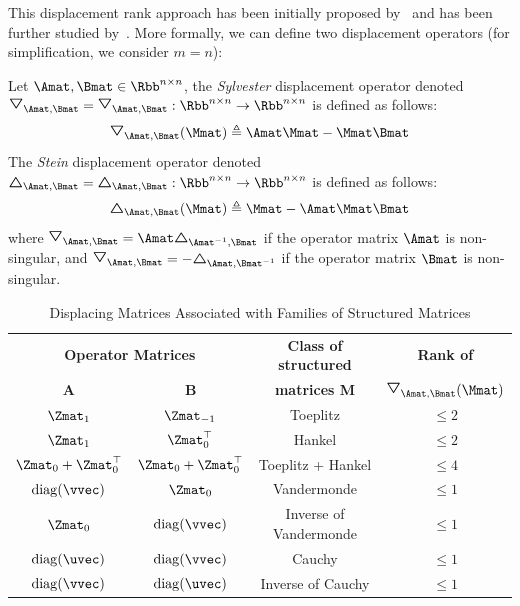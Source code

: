 This displacement rank approach has been initially proposed by~\citet{kailath1979displacement} and has been further studied by~\citet{kailath1995displacement,pan2001structured}.
More formally, we can define two displacement operators (for simplification, we consider $m = n$):
\begin{definition}
  Let $\Amat, \Bmat \in \Rbb^{n \times n}$, the \emph{Sylvester} displacement operator denoted $\triangleopdown_{\Amat, \Bmat} = \triangleopdown_{\Amat, \Bmat}: \Rbb^{n \times n} \rightarrow \Rbb^{n \times n}$ is defined as follows:
  \begin{equation}
    \triangleopdown_{\Amat, \Bmat} (\Mmat) \triangleq \Amat \Mmat - \Mmat \Bmat
  \end{equation}
  The \emph{Stein} displacement operator denoted $\triangleopup_{\Amat, \Bmat} = \triangleopup_{\Amat, \Bmat}: \Rbb^{n \times n} \rightarrow \Rbb^{n \times n}$ is defined as follows:
  \begin{equation}
    \triangleopup_{\Amat, \Bmat} (\Mmat) \triangleq \Mmat - \Amat \Mmat \Bmat
  \end{equation}
  where $\triangleopdown_{\Amat, \Bmat} = \Amat \triangleopup_{\Amat^{-1}, \Bmat}$ if the operator matrix $\Amat$ is non-singular, and $\triangleopdown_{\Amat, \Bmat} = -\triangleopup_{\Amat, \Bmat^{-1}}$ if the operator matrix $\Bmat$ is non-singular.
\end{definition}



\begin{table}[t]
  \centering
  \begin{tabular}{c|c|c|c}
    \toprule
    \multicolumn{2}{c|}{\textbf{Operator Matrices}} & \textbf{Class of structured} & \textbf{Rank of } \\
    \textbf{A} & \textbf{B} & \textbf{matrices M} & $\triangleopdown_{\Amat, \Bmat}(\Mmat)$ \\
    \midrule
    $\Zmat_1$                & $\Zmat_{-1}$             & Toeplitz               & $\leq 2$ \\
    $\Zmat_1$                & $\Zmat_0^\top$           & Hankel                 & $\leq 2$ \\
    $\Zmat_0 + \Zmat_0^\top$ & $\Zmat_0 + \Zmat_0^\top$ & Toeplitz + Hankel      & $\leq 4$ \\
    $\diag(\vvec)$           & $\Zmat_0$                & Vandermonde            & $\leq 1$ \\
    $\Zmat_0$                & $\diag(\vvec)$           & Inverse of Vandermonde & $\leq 1$ \\
    $\diag(\uvec)$           & $\diag(\vvec)$           & Cauchy                 & $\leq 1$ \\
    $\diag(\vvec)$           & $\diag(\uvec)$           & Inverse of Cauchy      & $\leq 1$ \\
    \bottomrule
  \end{tabular}
  \caption{Displacing Matrices Associated with Families of Structured Matrices \cite{pan2001structured}}
  \label{table:ch2-displacing_matrices}
\end{table}



